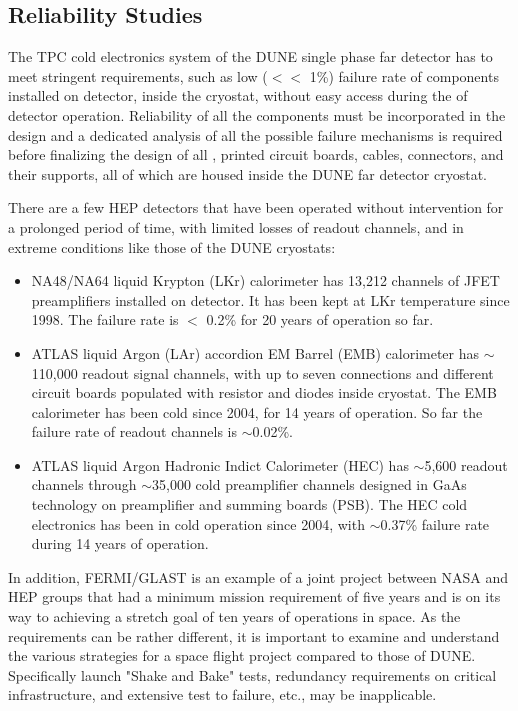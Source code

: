 {%
\subsection{Reliability Studies}
\label{sec:fdsp-tpcelec-qa-reliability}

The TPC cold electronics system of the DUNE single phase far detector has to meet stringent requirements, such as low ($<<$ 1\%) failure rate of components installed on detector, inside the cryostat, without easy access during the \dunelifetime of detector operation. Reliability of all the components must be incorporated in the design and a dedicated analysis of all the possible failure mechanisms is required before finalizing the design of all , printed circuit boards, cables, connectors, and their supports, all of which are housed inside the DUNE far detector cryostat. 

There are a few HEP detectors that have been operated without intervention for a prolonged period of time, with limited losses of readout channels, and in extreme conditions like those of the DUNE cryostats:
\begin{itemize}
	\item NA48/NA64 liquid Krypton (LKr) calorimeter has 13,212 channels of JFET preamplifiers installed on detector. It has been kept at LKr temperature since 1998. The failure rate is $<$ 0.2\% for 20 years of operation so far.
	\item ATLAS liquid Argon (LAr) accordion EM Barrel (EMB) calorimeter has $\sim$110,000 readout signal channels, with up to seven connections and different circuit boards populated with resistor and diodes inside cryostat. The EMB calorimeter has been cold since 2004, for 14 years of operation.  So far the failure rate of readout channels is $\sim$0.02\%.
	\item ATLAS liquid Argon Hadronic Indict Calorimeter (HEC) has $\sim$5,600 readout channels through $\sim$35,000 cold preamplifier channels designed in GaAs technology on preamplifier and summing boards (PSB). The HEC cold electronics has been in cold operation since 2004, with $\sim$0.37\% failure rate during 14 years of operation. 
\end{itemize}
In addition, FERMI/GLAST is an example of a joint project between NASA and HEP groups that had a minimum mission requirement of five years and is on its way to achieving a stretch goal of ten years of operations in space. As the requirements can be rather different, it is important to examine and understand the various strategies for a space flight project compared to those of DUNE. Specifically launch "Shake and Bake" tests, redundancy requirements on critical infrastructure, and extensive test to failure, etc., may be inapplicable.

}
